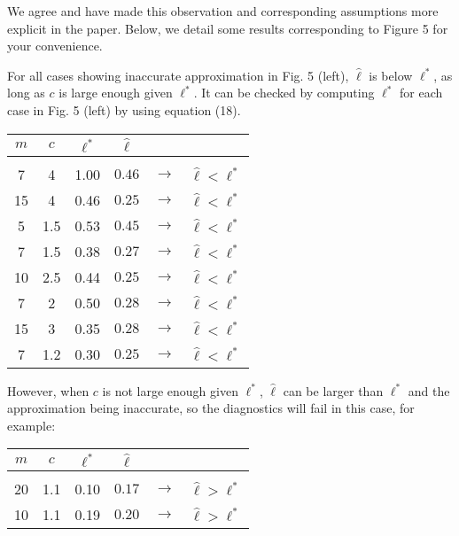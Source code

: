 \documentclass[11pt]{report}
\begin{document}
We agree and have made this observation and corresponding assumptions more explicit in the paper. Below, we detail some results corresponding to Figure 5 for your convenience.

For all cases showing inaccurate approximation in Fig. 5 (left), $\hat{\ell}$ is below $\ell^*$, as long as $c$ is large enough given $\ell^*$. It can be checked by computing $\ell^*$ for each case in Fig. 5 (left) by using equation (18). 


\begin{table}[h]
\centering
\begin{tabular}{ c c c c c c }
$m$ & $c$ & $\ell^*$ & $\hat{\ell}$ & \\ 
\hline \\[-4mm]
7  & 4   & 1.00 & $0.46$ & $\to$ & $\hat{\ell} < \ell^*$ \\
15 & 4   & 0.46 & $0.25$ & $\to$ & $\hat{\ell} < \ell^*$ \\
5  & 1.5 & 0.53 & $0.45$ & $\to$ & $\hat{\ell} < \ell^*$ \\
7  & 1.5 & 0.38 & $0.27$ & $\to$ & $\hat{\ell} < \ell^*$ \\
10 & 2.5 & 0.44 & $0.25$ & $\to$ & $\hat{\ell} < \ell^*$ \\
7  & 2   & 0.50 & $0.28$ & $\to$ & $\hat{\ell} < \ell^*$ \\
15 & 3   & 0.35 & $0.28$ & $\to$ & $\hat{\ell} < \ell^*$ \\
7  & 1.2 & 0.30 & $0.25$ & $\to$ & $\hat{\ell} < \ell^*$ \\
\end{tabular}
\end{table}

However, when $c$ is not large enough given $\ell^*$, $\hat{\ell}$ can be larger than $\ell^*$ and the approximation being inaccurate, so the diagnostics will fail in this case, for example:

\begin{table}[h]
\centering
\begin{tabular}{ c c c c c c }
$m$ & $c$ & $\ell^*$ & $\hat{\ell}$ & \\ 
\hline \\[-4mm]
20 & 1.1 & 0.10 & $0.17$ & $\to$ & $\hat{\ell} > \ell^*$ \\
10 & 1.1 & 0.19 & $0.20$ & $\to$ & $\hat{\ell} > \ell^*$ \\
\end{tabular}
\end{table}
\end{document}
